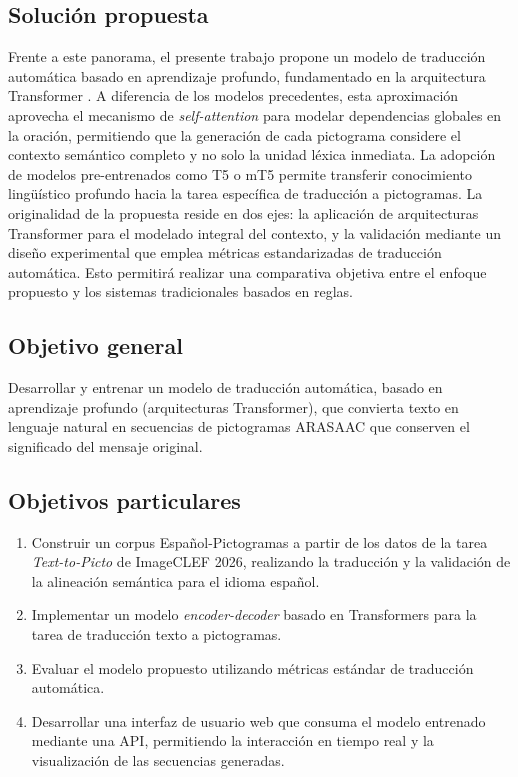 \subsection{Solución propuesta}
Frente a este panorama, el presente trabajo propone un modelo de traducción automática basado en aprendizaje profundo, fundamentado en la arquitectura Transformer \cite{vaswani2017attention}. A diferencia de los modelos precedentes, esta aproximación aprovecha el mecanismo de \textit{self-attention} para modelar dependencias globales en la oración, permitiendo que la generación de cada pictograma considere el contexto semántico completo y no solo la unidad léxica inmediata. La adopción de modelos pre-entrenados como T5 o mT5 \cite{raffel2020}  permite transferir conocimiento lingüístico profundo hacia la tarea específica de traducción a pictogramas. La originalidad de la propuesta reside en dos ejes: la aplicación de arquitecturas Transformer para el modelado integral del contexto, y la validación mediante un diseño experimental que emplea métricas estandarizadas de traducción automática. Esto permitirá realizar una comparativa objetiva entre el enfoque propuesto y los sistemas tradicionales basados en reglas.



\subsection{Objetivo general}

Desarrollar y entrenar un modelo de traducción automática, basado en aprendizaje profundo (arquitecturas Transformer), que convierta texto en lenguaje natural en secuencias de pictogramas ARASAAC que conserven el significado del mensaje original.



\subsection{Objetivos particulares}
\begin{enumerate}
    \item Construir un corpus  Español-Pictogramas a partir de los datos de la tarea \textit{Text-to-Picto} de ImageCLEF 2026, realizando la traducción  y la validación de la alineación semántica para el idioma español.
    \item Implementar un modelo \textit{encoder-decoder} basado en Transformers para la tarea de traducción texto a pictogramas.
    \item Evaluar el modelo propuesto utilizando métricas estándar de traducción automática.
    \item Desarrollar una interfaz de usuario web que consuma el modelo entrenado mediante una API, permitiendo la interacción en tiempo real y la visualización de las secuencias generadas.
\end{enumerate}


